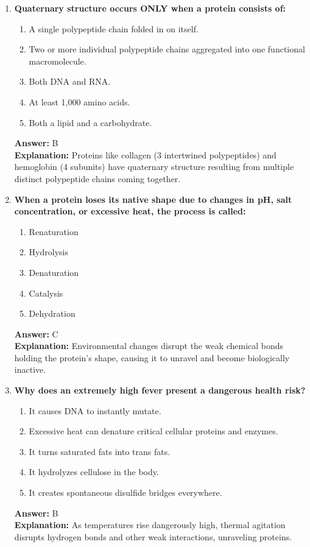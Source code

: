\documentclass[11pt, a4paper]{article}
\begin{document}
\begin{enumerate}
\item \textbf{Quaternary structure occurs ONLY when a protein consists of:}
\begin{enumerate}[label=\Alph*.]
    \item A single polypeptide chain folded in on itself.
    \item Two or more individual polypeptide chains aggregated into one functional macromolecule.
    \item Both DNA and RNA.
    \item At least 1,000 amino acids.
    \item Both a lipid and a carbohydrate.
\end{enumerate}
\textbf{Answer:} B \\
\textbf{Explanation:} Proteins like collagen (3 intertwined polypeptides) and hemoglobin (4 subunits) have quaternary structure resulting from multiple distinct polypeptide chains coming together.

\item \textbf{When a protein loses its native shape due to changes in pH, salt concentration, or excessive heat, the process is called:}
\begin{enumerate}[label=\Alph*.]
    \item Renaturation
    \item Hydrolysis
    \item Denaturation
    \item Catalysis
    \item Dehydration
\end{enumerate}
\textbf{Answer:} C \\
\textbf{Explanation:} Environmental changes disrupt the weak chemical bonds holding the protein's shape, causing it to unravel and become biologically inactive.

\item \textbf{Why does an extremely high fever present a dangerous health risk?}
\begin{enumerate}[label=\Alph*.]
    \item It causes DNA to instantly mutate.
    \item Excessive heat can denature critical cellular proteins and enzymes.
    \item It turns saturated fats into trans fats.
    \item It hydrolyzes cellulose in the body.
    \item It creates spontaneous disulfide bridges everywhere.
\end{enumerate}
\textbf{Answer:} B \\
\textbf{Explanation:} As temperatures rise dangerously high, thermal agitation disrupts hydrogen bonds and other weak interactions, unraveling proteins.


\end{enumerate}
\end{document}
